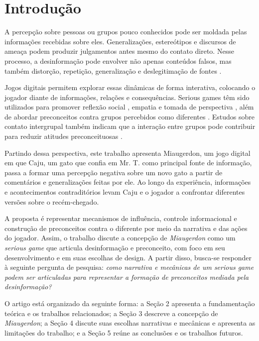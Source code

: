 \documentclass[12pt]{article}
\begin{document}
\section{Introdução}

A percepção sobre pessoas ou grupos pouco conhecidos pode ser moldada pelas informações recebidas sobre eles. Generalizações, estereótipos e discursos de ameaça podem produzir julgamentos antes mesmo do contato direto. Nesse processo, a desinformação pode envolver não apenas conteúdos falsos, mas também distorção, repetição, generalização e deslegitimação de fontes \cite{bad_news}.

Jogos digitais permitem explorar essas dinâmicas de forma interativa, colocando o jogador diante de informações, relações e consequências. Serious games têm sido utilizados para promover reflexão social \cite{dallaqua}, empatia e tomada de perspectiva \cite{Belman2009}, além de abordar preconceitos contra grupos percebidos como diferentes \cite{a_path_out}. Estudos sobre contato intergrupal também indicam que a interação entre grupos pode contribuir para reduzir atitudes preconceituosas \cite{Pettigrew2006}.

Partindo dessa perspectiva, este trabalho apresenta Miaugerdon, um jogo digital em que Caju, um gato que confia em Mr. T. como principal fonte de informação, passa a formar uma percepção negativa sobre um novo gato a partir de comentários e generalizações feitas por ele. Ao longo da experiência, informações e acontecimentos contraditórios levam Caju e o jogador a confrontar diferentes versões sobre o recém-chegado.

A proposta é representar mecanismos de influência, controle informacional e construção de preconceitos contra o diferente por meio da narrativa e das ações do jogador. Assim, o trabalho discute a concepção de \textit{Miaugerdon} como um \textit{serious game} que articula desinformação e preconceito, com foco em seu desenvolvimento e em suas escolhas de design. A partir disso, busca-se responder à seguinte pergunta de pesquisa: \textit{como narrativa e mecânicas de um serious game podem ser articuladas para representar a formação de preconceitos mediada pela desinformação?}

O artigo está organizado da seguinte forma: a Seção 2 apresenta a fundamentação teórica e os trabalhos relacionados; a Seção 3 descreve a concepção de \textit{Miaugerdon}; a Seção 4 discute suas escolhas narrativas e mecânicas e apresenta as limitações do trabalho; e a Seção 5 reúne as conclusões e os trabalhos futuros.
\end{document}
